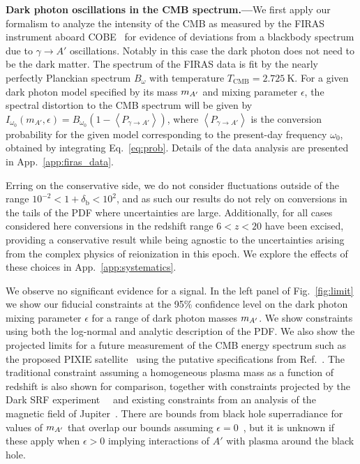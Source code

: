 \documentclass[prd,aps,10pt,nofootinbib,twocolumn,superscriptaddress,preprintnumbers,balancelastpage,longbibliography]{revtex4-1}
\begin{document}
\noindent
{\bf Dark photon oscillations in the CMB spectrum.---}We first apply our formalism to analyze the intensity of the CMB as measured by the FIRAS instrument aboard COBE~\cite{Fixsen:1996nj} for evidence of deviations from a blackbody spectrum due to $\gamma \to A'$ oscillations. Notably in this case the dark photon does not need to be the dark matter. The spectrum of the FIRAS data is fit by the nearly perfectly Planckian spectrum $B_{\omega}$ with temperature $T_\mathrm{CMB} = \SI{2.725}{\kelvin}$. For a given dark photon model specified by its mass $m_{A^\prime}$ and mixing parameter $\epsilon$, the spectral distortion to the CMB spectrum will be given by $I_{\omega_0}\left(m_{A'}, \epsilon\right)=B_{\omega_0}\left(1- \left< P_{\gamma \rightarrow A'} \right>\right)$, where $\left\langle P_{\gamma \rightarrow A'} \right\rangle$ is the conversion probability for the given model corresponding to the present-day frequency $\omega_0$, obtained by integrating Eq.~\eqref{eq:prob}.  Details of the data analysis are presented in App.~\ref{app:firas_data}.

Erring on the conservative side, we do not consider fluctuations outside of the range $10^{-2} < 1 + \delta_\mathrm{b} < 10^2$, and as such our results do not rely on conversions in the tails of the PDF where uncertainties are large. Additionally, for all cases considered here conversions in the redshift range $6 < z < 20$ have been excised, providing a conservative result while being agnostic to the uncertainties arising from the complex physics of reionization in this epoch. We explore the effects of these choices in App.~\ref{app:systematics}.

We observe no significant evidence for a signal. In the left panel of Fig.~\ref{fig:limit} we show our fiducial constraints at the 95\% confidence level on the dark photon mixing parameter $\epsilon$ for a range of dark photon masses $m_{A^\prime}$. We show constraints using both the log-normal and analytic description of the PDF\@. We also show the projected limits for a future measurement of the CMB energy spectrum such as the proposed PIXIE satellite~\cite{Kogut:2011xw} using the putative specifications from Ref.~\cite{Kunze:2015noa}. The traditional constraint assuming a homogeneous plasma mass as a function of redshift is also shown for comparison, together with constraints projected by the Dark SRF experiment~~\cite{HarnikSRF,GrassellinoSRF} and existing constraints from an analysis of the magnetic field of Jupiter~\cite{Davis:1975mn}.  There are bounds from black hole superradiance for values of $m_{A^\prime}$ that overlap our bounds assuming $\epsilon = 0$~\cite{Pani:2012vp,Baryakhtar:2017ngi,Cardoso:2018tly}, but it is unknown if these apply when $\epsilon > 0$ implying interactions of  $A'$ with plasma around the black hole.
\end{document}
